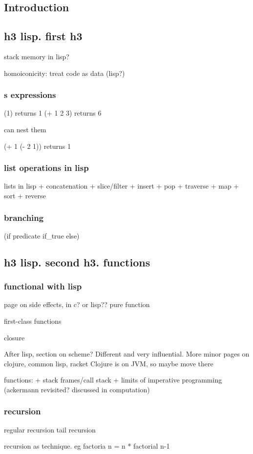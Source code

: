 
\subsection{Introduction}

\subsection{h3 lisp. first h3}
stack memory in lisp?

homoiconicity: treat code as data (lisp?)
\subsubsection{s expressions}
(1) returns 1
(+ 1 2 3) returns 6

can nest them

(+ 1 (- 2 1)) returns 1
\subsubsection{list operations in lisp}
lists in lisp
+ concatenation
+ slice/filter
+ insert
+ pop
+ traverse
+ map
+ sort
+ reverse
\subsubsection{branching}
(if predicate if\_true else)
\subsection{h3 lisp. second h3. functions}
\subsubsection{functional with lisp}
page on side effects, in c? or lisp??
pure function

first-class functions

closure

After lisp, section on scheme? Different and very influential.
More minor pages on clojure, common lisp, racket
Clojure is on JVM, so maybe move there

functions:
+ stack frames/call stack
+ limits of imperative programming (ackermann revisited? discussed in computation)
\subsubsection{recursion}
regular recursion
tail recursion

recursion as technique. eg factoria n = n * factorial n-1
